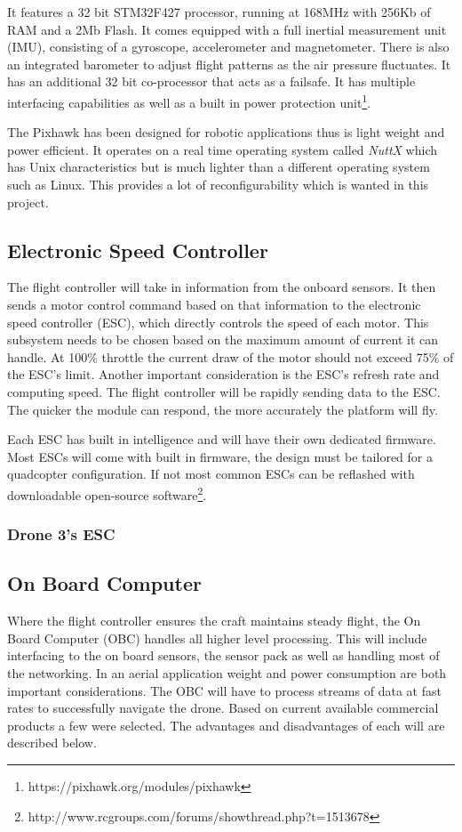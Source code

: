 			It features a 32 bit STM32F427 processor, running at 168MHz with 256Kb of RAM and a 2Mb Flash. It comes equipped with a full inertial measurement unit (IMU), consisting of a gyroscope, accelerometer and magnetometer. There is also an integrated barometer to adjust flight patterns as the air pressure fluctuates. It has an additional 32 bit co-processor that acts as a failsafe. It has multiple interfacing capabilities as well as a built in power protection unit\footnote{https://pixhawk.org/modules/pixhawk}. 
			
			The Pixhawk has been designed for robotic applications thus is light weight and power efficient. It operates on a real time operating system called \textit{NuttX} which has Unix characteristics but is much lighter than a different operating system such as Linux. This provides a lot of reconfigurability which is wanted in this project.
		
		
			\subsection{Electronic Speed Controller}
			The flight controller will take in information from the onboard sensors. It then sends a motor control command based on that information to the electronic speed controller (ESC), which directly controls the speed of each motor. This subsystem needs to be chosen based on the maximum amount of current it can handle. At 100\% throttle the current draw of the motor should not exceed 75\% of the ESC's limit. Another important consideration is the ESC's refresh rate and computing speed. The flight controller will be rapidly sending data to the ESC. The quicker the module can respond, the more accurately the platform will fly. 
			
			Each ESC has built in intelligence and will have their own dedicated firmware. Most ESCs will come with built in firmware, the design must be tailored for a quadcopter configuration. If not most common ESCs can be reflashed with downloadable open-source software\footnote{http://www.rcgroups.com/forums/showthread.php?t=1513678}.
			
				\subsubsection{Drone 3's ESC}
		
			\subsection{On Board Computer}
			Where the flight controller ensures the craft maintains steady flight, the On Board Computer (OBC) handles all higher level processing. This will include interfacing to the on board sensors, the sensor pack as well as handling most of the networking. In an aerial application weight and power consumption are both important considerations. The OBC will have to process streams of data at fast rates to successfully navigate the drone. Based on current available commercial products a few were selected. The advantages and disadvantages of each will are described below.
		
